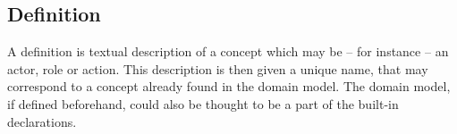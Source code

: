 \subsection{Definition}
A definition is textual description of a concept which may be -- for instance -- an actor, role or action. This description is then given a unique name, that may correspond to a concept already found in the domain model. The domain model, if defined beforehand, could also be thought to be a part of the built-in declarations.
